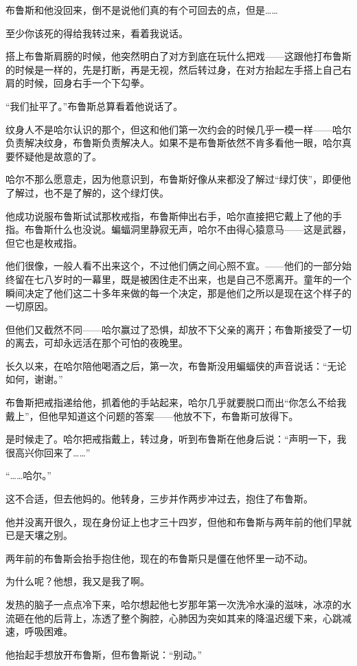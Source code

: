 \documentclass[../main]{subfiles}
\begin{document}
布鲁斯和他没回来，倒不是说他们真的有个可回去的点，但是……

至少你该死的得给我转过来，看着我说话。

搭上布鲁斯肩膀的时候，他突然明白了对方到底在玩什么把戏——这跟他打布鲁斯的时候是一样的，先是打断，再是无视，然后转过身，在对方抬起左手搭上自己右肩的时候，回身右手一个下勾拳。

“我们扯平了。”布鲁斯总算看着他说话了。

纹身人不是哈尔认识的那个，但这和他们第一次约会的时候几乎一模一样——哈尔负责解决纹身，布鲁斯负责解决人。如果不是布鲁斯依然不肯多看他一眼，哈尔真要怀疑他是故意的了。

哈尔不那么愿意走，因为他意识到，布鲁斯好像从来都没了解过“绿灯侠”，即便他了解过，也不是了解的，这个绿灯侠。

他成功说服布鲁斯试试那枚戒指，布鲁斯伸出右手，哈尔直接把它戴上了他的手指。布鲁斯什么也没说。蝙蝠洞里静寂无声，哈尔不由得心猿意马——这是武器，但它也是枚戒指。

他们很像，一般人看不出来这个，不过他们俩之间心照不宣。——他们的一部分始终留在七八岁时的一幕里，既是被困住走不出来，也是自己不愿离开。童年的一个瞬间决定了他们这二十多年来做的每一个决定，那是他们之所以是现在这个样子的一切原因。

但他们又截然不同——哈尔赢过了恐惧，却放不下父亲的离开；布鲁斯接受了一切的离去，可却永远活在那个可怕的夜晚里。

长久以来，在哈尔陪他喝酒之后，第一次，布鲁斯没用蝙蝠侠的声音说话：“无论如何，谢谢。”

布鲁斯把戒指递给他，抓着他的手站起来，哈尔几乎就要脱口而出“你怎么不给我戴上”，但他早知道这个问题的答案——他放不下，布鲁斯可放得下。

是时候走了。哈尔把戒指戴上，转过身，听到布鲁斯在他身后说：“声明一下，我很高兴你回来了……”

“……哈尔。”

这不合适，但去他妈的。他转身，三步并作两步冲过去，抱住了布鲁斯。

他并没离开很久，现在身份证上也才三十四岁，但他和布鲁斯与两年前的他们早就已是天壤之别。

两年前的布鲁斯会抬手抱住他，现在的布鲁斯只是僵在他怀里一动不动。

为什么呢？他想，我又是我了啊。

发热的脑子一点点冷下来，哈尔想起他七岁那年第一次洗冷水澡的滋味，冰凉的水流砸在他的后背上，冻透了整个胸腔，心肺因为突如其来的降温迟缓下来，心跳减速，呼吸困难。

他抬起手想放开布鲁斯，但布鲁斯说：“别动。”
\end{document}
